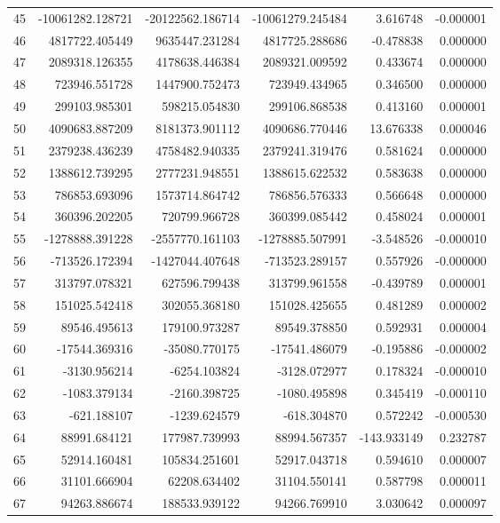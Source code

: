 \begin{tabular}{lrrrrr}
45 & -10061282.128721 & -20122562.186714 & -10061279.245484 & 3.616748 & -0.000001 \\
46 & 4817722.405449 & 9635447.231284 & 4817725.288686 & -0.478838 & 0.000000 \\
47 & 2089318.126355 & 4178638.446384 & 2089321.009592 & 0.433674 & 0.000000 \\
48 & 723946.551728 & 1447900.752473 & 723949.434965 & 0.346500 & 0.000000 \\
49 & 299103.985301 & 598215.054830 & 299106.868538 & 0.413160 & 0.000001 \\
50 & 4090683.887209 & 8181373.901112 & 4090686.770446 & 13.676338 & 0.000046 \\
51 & 2379238.436239 & 4758482.940335 & 2379241.319476 & 0.581624 & 0.000000 \\
52 & 1388612.739295 & 2777231.948551 & 1388615.622532 & 0.583638 & 0.000000 \\
53 & 786853.693096 & 1573714.864742 & 786856.576333 & 0.566648 & 0.000000 \\
54 & 360396.202205 & 720799.966728 & 360399.085442 & 0.458024 & 0.000001 \\
55 & -1278888.391228 & -2557770.161103 & -1278885.507991 & -3.548526 & -0.000010 \\
56 & -713526.172394 & -1427044.407648 & -713523.289157 & 0.557926 & -0.000000 \\
57 & 313797.078321 & 627596.799438 & 313799.961558 & -0.439789 & 0.000001 \\
58 & 151025.542418 & 302055.368180 & 151028.425655 & 0.481289 & 0.000002 \\
59 & 89546.495613 & 179100.973287 & 89549.378850 & 0.592931 & 0.000004 \\
60 & -17544.369316 & -35080.770175 & -17541.486079 & -0.195886 & -0.000002 \\
61 & -3130.956214 & -6254.103824 & -3128.072977 & 0.178324 & -0.000010 \\
62 & -1083.379134 & -2160.398725 & -1080.495898 & 0.345419 & -0.000110 \\
63 & -621.188107 & -1239.624579 & -618.304870 & 0.572242 & -0.000530 \\
64 & 88991.684121 & 177987.739993 & 88994.567357 & -143.933149 & 0.232787 \\
65 & 52914.160481 & 105834.251601 & 52917.043718 & 0.594610 & 0.000007 \\
66 & 31101.666904 & 62208.634402 & 31104.550141 & 0.587798 & 0.000011 \\
67 & 94263.886674 & 188533.939122 & 94266.769910 & 3.030642 & 0.000097 \\

\end{tabular}
